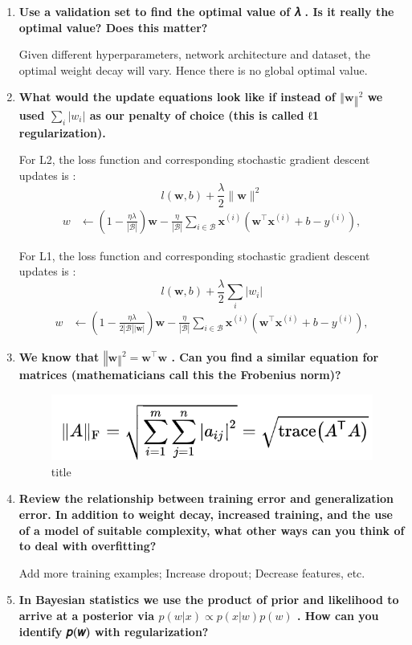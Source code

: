 \documentclass[11pt]{article}
\makeatletter
\def\maxwidth{\ifdim\Gin@nat@width>\linewidth\linewidth
    \else\Gin@nat@width\fi}
\let\Oldincludegraphics\includegraphics
\renewcommand{\includegraphics}[1]{\Oldincludegraphics[width=.8\maxwidth]{#1}}
\makeatother
\begin{document}
    \begin{enumerate}
\def\labelenumi{\arabic{enumi}.}
\setcounter{enumi}{1}
\item
  \textbf{Use a validation set to find the optimal value of 𝜆 . Is it
  really the optimal value? Does this matter?}

  Given different hyperparameters, network architecture and dataset, the
  optimal weight decay will vary. Hence there is no global optimal
  value.
\item
  \textbf{What would the update equations look like if instead of
  \(‖𝐰‖^2\) we used \(∑_𝑖|𝑤_𝑖|\) as our penalty of choice (this is
  called ℓ1 regularization).}

  For L2, the loss function and corresponding stochastic gradient
  descent updates is :
  \[l(\mathbf{w}, b) + \frac{\lambda}{2} \|\boldsymbol{w}\|^2\]
  \[\begin{aligned}
  w & \leftarrow \left(1- \frac{\eta\lambda}{|\mathcal{B}|} \right) \mathbf{w} - \frac{\eta}{|\mathcal{B}|} \sum_{i \in \mathcal{B}} \mathbf{x}^{(i)} \left(\mathbf{w}^\top \mathbf{x}^{(i)} + b - y^{(i)}\right),
  \end{aligned}\]

  For L1, the loss function and corresponding stochastic gradient
  descent updates is : \[l(\mathbf{w}, b) + \frac{\lambda}{2} ∑_𝑖|𝑤_𝑖|\]
  \[\begin{aligned}
  w & \leftarrow \left(1- \frac{\eta\lambda}{2 |\mathcal{B}| \mathbf{|w|}} \right) \mathbf{w} - \frac{\eta}{|\mathcal{B}|} \sum_{i \in \mathcal{B}} \mathbf{x}^{(i)} \left(\mathbf{w}^\top \mathbf{x}^{(i)} + b - y^{(i)}\right),
  \end{aligned}\]
\item
  \textbf{We know that \(‖𝐰‖^2=𝐰^⊤𝐰\) . Can you find a similar equation
  for matrices (mathematicians call this the Frobenius norm)?}

  \begin{figure}
  \centering
  \includegraphics{image/textbook_solution_4.5.6.png}
  \caption{title}
  \end{figure}
\item
  \textbf{Review the relationship between training error and
  generalization error. In addition to weight decay, increased training,
  and the use of a model of suitable complexity, what other ways can you
  think of to deal with overfitting?}

  Add more training examples; Increase dropout; Decrease features, etc.
\item
  \textbf{In Bayesian statistics we use the product of prior and
  likelihood to arrive at a posterior via \(𝑝(𝑤|𝑥)∝𝑝(𝑥|𝑤)𝑝(𝑤)\) . How
  can you identify 𝑝(𝑤) with regularization?}
\end{enumerate}
\end{document}

